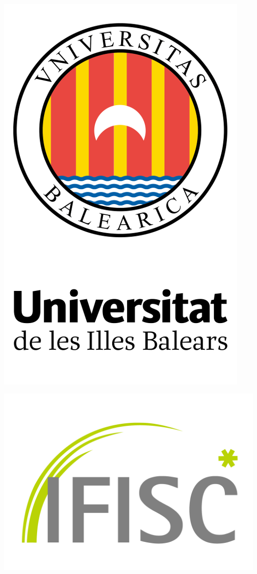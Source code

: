 \documentclass[../main.tex]{subfiles}
\begin{document}
\begin{titlepage}
    \begin{addmargin}[-1cm]{-3cm}
        \large

        \hfill
        \begin{minipage}[c][0.2\textheight]{0.5\textwidth}
            \includegraphics[width=.75\textwidth]{frontbackmatter/figures/uib.png}
        \end{minipage}
        \hfill
        \begin{minipage}[c][0.2\textheight]{0.5\textwidth}
            \includegraphics[width=1\textwidth]{frontbackmatter/figures/ifisc.pdf}

\end{minipage}
\end{addmargin}
\end{titlepage}
\end{document}
